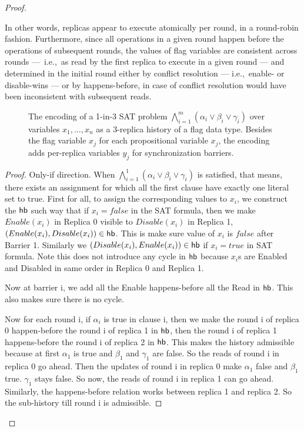 \begin{proof}
\begin{enumerate}
\vspace{-1.5mm}
  \end{enumerate}

  In other words, replicas appear to execute atomically per round, in a round-robin fashion. Furthermore, since all operations in a given round happen before the operations of subsequent rounds, the values of flag variables are consistent across rounds — i.e.,~as read by the first replica to execute in a given round — and determined in the initial round either by conflict resolution — i.e.,~enable- or disable-wins — or by happens-before, in case of conflict resolution would have been inconsistent with subsequent reads.

  \begin{figure}[t]
    \centering
    {\scriptsize}
         \vspace{-1mm}
    \caption{The encoding of a 1-in-3 SAT problem $\bigwedge_{i=1}^{m} (\alpha_i \lor \beta_i \lor \gamma_i)$ over variables $x_1, \ldots, x_n$ as a 3-replica history of a flag data type. Besides the flag variable $x_j$ for each propositional variable $x_j$, the encoding adds per-replica variables $y_j$ for synchronization barriers.}
    \label{fig:3sat-to-flags}
    \vspace{-4mm}
  \end{figure}


  \begin{proof}
    Only-if direction.
    When $\bigwedge_{i=1}^{1} (\alpha_i \lor \beta_i \lor \gamma_i)$ is satisfied, that means, there exists an assignment for which all the first clause have exactly one literal set to true. First for all, to assign the corresponding values to $x_i$, we construct the $\textsf{hb}$ such way that if $x_i = false$ in the SAT formula, then we make $Enable(x_i)$ in Replica 0 visible to $Disable(x_i)$ in Replica 1, \ie $(Enable(x_i), Disable(x_i)) \in \textsf{hb}$. This is make sure value of $x_i$ is $false$ after Barrier 1. Similarly we $(Disable(x_i), Enable(x_i)) \in \textsf{hb}$ if $x_i = true$ in SAT formula. Note this does not introduce any cycle in $\textsf{hb}$ because $x_i$s are \textrm{Enable}d and \textrm{Disable}d in same order in Replica 0 and Replica 1.

    Now at barrier i, we add all the \textrm{Enable} happens-before all the \textrm{Read} in $\textsf{hb}$. This also makes sure there is no cycle.

    Now for each round i, if $\alpha_i$ is true in clause i, then we make the round i of replica 0 happen-before the round i of replica 1 in $\textsf{hb}$, then the round i of replica 1 happens-before the round i of replica 2 in $\textsf{hb}$. This makes the history admissible because at first $\alpha_1$ is true and $\beta_1$ and $\gamma_1$ are false. So the reads of round i in replica 0 go ahead. Then the updates of round i in replica 0 make $\alpha_1$ false and $\beta_1$ true. $\gamma_1$ stays false. So now, the reads of round i in replica 1 can go ahead. Similarly, the happens-before relation works between replica 1 and replica 2. So the sub-history till round i is admissible.
    

\end{proof}
\end{proof}
